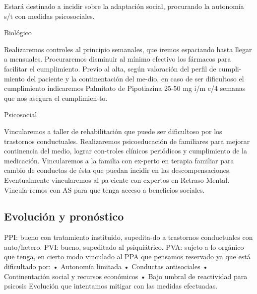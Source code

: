 Estará destinado a incidir sobre la adaptación social, procurando la autonomía s/t con medidas psicosociales.

Biológico

Realizaremos controles al principio semanales, que iremos espaciando hasta llegar a mensuales. Procuraremos disminuir al mínimo efectivo los fármacos para facilitar el cumplimiento. Previo al alta, según valoración del perfil de cumpli-miento del paciente y la continentación del me-dio, en caso de ser dificultoso el cumplimiento indicaremos Palmitato de Pipotiazina 25-50 mg i/m c/4 semanas que nos asegura el cumplimien-to.

Psicosocial

Vincularemos a taller de rehabilitación que puede ser dificultoso por los trastornos conductuales. Realizaremos psicoeducación de familiares para mejorar continencia del medio, lograr con-troles clínicos periódicos y cumplimiento de la medicación. Vincularemos a la familia con ex-perto en terapia familiar para cambio de conductas de ésta que puedan incidir en las descompensaciones. Eventualmente vincularemos al pa-ciente con expertos en Retraso Mental. Vincula-remos con AS para que tenga acceso a beneficios sociales.

\subsection*{Evolución y pronóstico}
PPI: bueno con tratamiento instituido, supedita-do a trastornos conductuales con auto/hetero. PVI: bueno, supeditado al psiquiátrico. PVA: sujeto a lo orgánico que tenga, en cierto modo vinculado al PPA que pensamos reservado ya que está dificultado por: • Autonomía limitada • Conductas antisociales • Continentación social y recursos económicos • Bajo umbral de reactividad para psicosis Evolución que intentamos mitigar con las medidas efectuadas.

